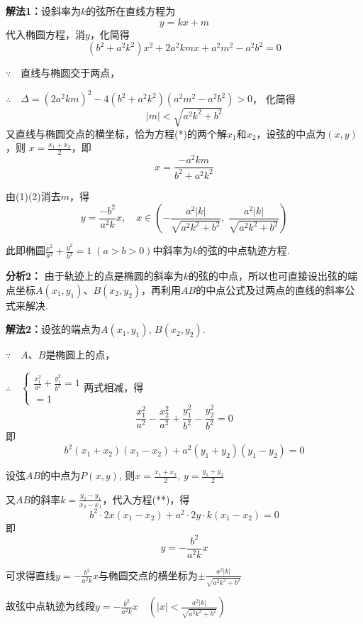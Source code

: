 \begin{solution}
 \textbf{解法1：}设斜率为$k$的弦所在直线方程为
\begin{equation}
    y=kx+m  \tag{1}
\end{equation}
代入椭圆方程，消$y$，化简得
\begin{equation}
    (b^2+a^2k^2)x^2+2a^2kmx+a^2m^2-a^2b^2=0 \tag{*}
\end{equation}

$\because\quad $直线与椭圆交于两点，

$\therefore\quad \Delta =(2a^2km)^2-4(b^2+a^2k^2)(a^2m^2-a^2b^2)>0$，
化简得
\[|m|<\sqrt{a^2k^2+b^2}\]
又直线与椭圆交点的横坐标，恰为方程(*)的两个解$x_1$和$x_2$，设弦的中点为$(x,y)$，则
$x=\frac{x_1+x_2}{2}$，即
\begin{equation}
    x=\frac{-a^2km}{b^2+a^2k^2} \tag{2}
\end{equation}

由(1)(2)消去$m$，得
\[y=\frac{-b^2}{a^2 k}x,\quad x\in\left(-\frac{a^2|k|}{\sqrt{a^2k^2+b^2}},\; \frac{a^2|k|}{\sqrt{a^2k^2+b^2}}\right)\]

此即椭圆$\frac{x^2}{a^2}+\frac{y^2}{b^2}=1\; (a>b>0)$中斜率为$k$的弦的中点轨迹方程.
\end{solution}

\begin{analyze}
\textbf{分析2：}
 由于轨迹上的点是椭圆的斜率为$k$的弦的中点，所以也可直接设出弦的端点坐标$A(x_1,y_1)$、$B(x_2,y_2)$，再利用$AB$的中点公式及过两点的直线的斜率公式来解决.
\end{analyze}

\begin{solution}
\textbf{解法2：}设弦的端点为$A(x_1,y_1)$, $B(x_2,y_2)$.

$\because\quad A$、$B$是椭圆上的点，

$\therefore\quad \begin{cases}
    \frac{x_1^2}{a^2}+\frac{y_1^2}{b^2}=1\\
    =1
\end{cases}$两式相减，得
\[ \frac{x_1^2}{a^2}-\frac{x_2^2}{a^2}+\frac{y_1^2}{b^2}-\frac{y_2^2}{b^2} =0\]
即
\begin{equation}
    b^2(x_1+x_2)(x_1-x_2)+a^2(y_1+y_2)(y_1-y_2)=0 \tag{**}
\end{equation}

设弦$AB$的中点为$P(x,y)$, 则$x=\frac{x_1+x_2}{2}$, $y=\frac{y_1+y_2}{2}$

又$AB$的斜率$k=\frac{y_2-y_1}{x_2-x_1}$，代入方程(**)，得
\[b^2\cdot 2x(x_1-x_2)+a^2\cdot 2y\cdot k(x_1-x_2)=0\]
即
\[y=-\frac{b^2}{a^2k}x\]

可求得直线$y=-\frac{b^2}{a^2k}x$与椭圆交点的横坐标为$\pm\frac{a^2|k|}{\sqrt{a^2k^2+b^2}}$

故弦中点轨迹为线段$y=-\frac{b^2}{a^2k}x\quad \left(|x|<\frac{a^2|k|}{\sqrt{a^2k^2+b^2}}\right)$
\end{solution}

